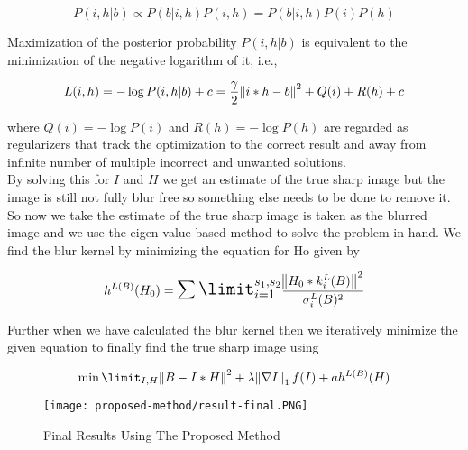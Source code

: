 \documentclass{article}
\begin{document}
\begin{equation}
    P(i, h | b) \propto P(b | i, h) P(i, h) = P(b | i, h) P(i) P(h)
\end{equation}

Maximization of the posterior probability $P(i,h | b)$ is equivalent to the minimization of the negative logarithm of it, i.e., 

\begin{equation}
    L(i, h) = -\log{P(i, h | b)} + c = \frac{\gamma}{2} \norm{i * h - b}^2 + Q(i) + R(h) + c
\end{equation}

where $Q(i) = −\log{P(i)}$ and $R(h) = −\log{P(h)}$ are regarded as regularizers that track the optimization to the correct result and away from infinite number of multiple incorrect and unwanted solutions. \\

By solving this for $I$ and $H$ we get an estimate of the true sharp image but the image is still not fully blur free so something else needs to be done to remove it. \\

So now we take the estimate of the true sharp image is taken as the blurred image and we use the eigen value based method to solve the problem in hand. We find the blur kernel by minimizing the equation for Ho given by 

\begin{equation}
    h^{L(B)}(H_0) = \mathlarger{\mathlarger{\sum\limit_{i = 1}^{s_1, s_2}}} \frac{\norm{H_0 * k_i^L(B)}^2}{\sigma_i^L(B)^2}
\end{equation}

Further when we have calculated the blur kernel then we iteratively minimize the given equation to finally find the true sharp image using 

\begin{equation}
    \min\limit_{I, H} \norm{B - I * H}^2 + \lambda \norm{\nabla I}_1 f(I) + a h^{L(B)}(H)
\end{equation}

\begin{figure}
    \centering
    \texttt{[image: proposed-method/result-final.PNG]}
    \caption{Final Results Using The Proposed Method}
    \label{fig:my_label}
\end{figure}
\end{document}
